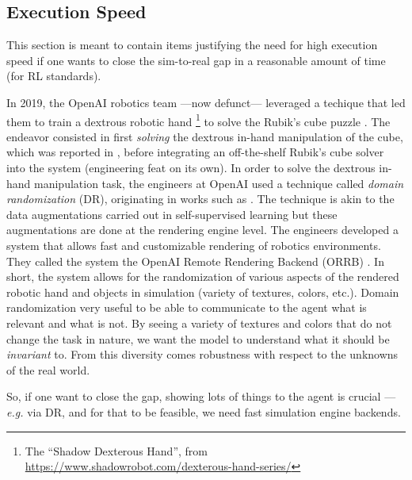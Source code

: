 \documentclass[12pt,a4paper]{article}
\begin{document}
\subsection{Execution Speed}
\label{ss:speed}

This section is meant to contain items justifying the need for high execution speed if one wants
to close the sim-to-real gap in a reasonable amount of time (for RL standards).

In 2019, the OpenAI robotics team ---now defunct--- leveraged a techique that led
them to train a dextrous robotic hand \footnote{The ``Shadow Dexterous Hand'', from
\url{https://www.shadowrobot.com/dexterous-hand-series/}}
to solve the Rubik's cube puzzle \cite{OpenAI2019-vy}.
The endeavor consisted in first \textit{solving} the dextrous in-hand manipulation of the cube,
which was reported in \cite{OpenAI2018-sm}, before integrating an off-the-shelf Rubik's cube
solver into the system (engineering feat on its own).
In order to solve the dextrous in-hand manipulation task, the engineers at OpenAI used a
technique called \emph{domain randomization} (DR), originating in works such as
\cite{Tobin2017-ir, Tan2018-ux}.
The technique is akin to the data augmentations carried out in self-supervised learning
but these augmentations are done at the rendering engine level. The engineers developed a
system that allows fast and customizable rendering of robotics environments. They called the
system the OpenAI Remote Rendering Backend (ORRB) \cite{Chociej2019-ot}.
In short, the system allows for the randomization of various aspects of the rendered robotic
hand and objects in simulation (variety of textures, colors, etc.).
Domain randomization very useful to be able to communicate to the agent what is relevant and what
is not. By seeing a variety of textures and colors that do not change the task in nature, we
want the model to understand what it should be \emph{invariant} to.
From this diversity comes robustness with respect to the unknowns of the real world.

So, if one want to close the gap, showing lots of things to the agent is crucial
--- \textit{e.g.} via DR, and for that to be feasible, we need fast simulation engine backends.
\end{document}
